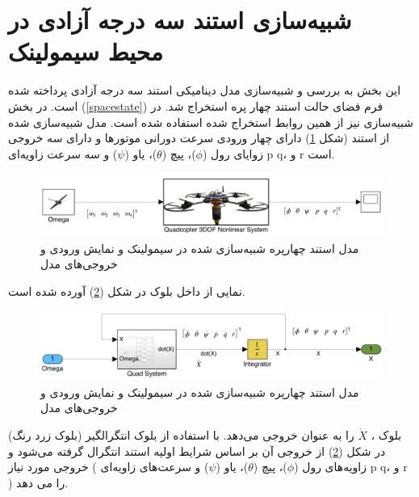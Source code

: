 \section{شبیه‌سازی استند سه درجه آزادی در محیط سیمولینک}
این بخش به بررسی و شبیه‌سازی مدل دینامیکی استند سه درجه آزادی پرداخته شده است. در بخش (\ref{spacestate}) فرم فضای حالت استند چهار پره استخراج شد. در شبیه‌سازی نیز از همین روابط استخراج شده استفاده شده است. مدل شبیه‌سازی شده از استند (شکل \ref{quadsimulink}) دارای چهار ورودی سرعت دورانی موتورها  و دارای سه خروجی زوایای رول ($\phi$)، پیچ ($\theta$)، یاو ($\psi$) و  سه سرعت زاویه‌ای
 p
 q،
 و 
r 
 است.
 
 
\begin{figure}[H]
	\includegraphics[width=16cm]{../../Figures/QuadSimulation/Stand_Model.png}
	\centering
	\vspace*{-15mm}
	\caption{مدل استند چهارپره شبیه‌سازی شده در سیمولینک و نمایش ورودی و خروجی‌های مدل}
	\label{quadsimulink}
\end{figure}
نمایی از داخل بلوک
در شکل (\ref{Quad3DOF}) آورده شده است.
\begin{figure}[H]
	\includegraphics[width=16cm]{../../Figures/QuadSimulation/Integrator.png}
	\centering
	\vspace*{-15mm}
	\caption{مدل استند چهارپره شبیه‌سازی شده در سیمولینک و نمایش ورودی و خروجی‌های مدل}
	\label{Quad3DOF}
\end{figure}
بلوک
،
$\dot X$ را به عنوان خروجی می‌دهد. با استفاده از بلوک انتگرالگیر (بلوک زرد رنگ) در شکل
(\ref{Quad3DOF})
از خروجی آن بر اساس شرایط اولیه استند انتگرال گرفته می‌شود و خروجی مورد نیاز ( زاویه‌های رول ($\phi$)، پیچ ($\theta$)، یاو ($\psi$) و سرعت‌های زاویه‌ای‌
p
q،
و 
r )
را می دهد.

